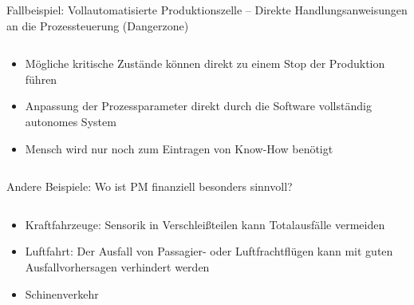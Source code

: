 \documentclass[aspectratio=1610, xcolor=dvipsnames, 9pt]{beamer}
\begin{document}
          \begin{frame}{Fallbeispiel: Vollautomatisierte Produktionszelle -- Direkte Handlungsanweisungen an die Prozessteuerung (Dangerzone)}
            \begin{columns}
              \begin{column}{0.6\textwidth}
                \begin{itemize}
                  \item Mögliche kritische Zustände können direkt zu einem Stop der Produktion führen \newline
                  \item Anpassung der Prozessparameter direkt durch die Software \rightarrow vollständig autonomes System \newline 
                  \item Mensch wird nur noch zum Eintragen von Know-How benötigt \newline
                \end{itemize}
              \end{column}
            \end{columns}
          \end{frame}

          
          \begin{frame}{Andere Beispiele: Wo ist PM finanziell besonders sinnvoll?}
            \begin{columns}
              \begin{column}{1\textwidth}
                \begin{itemize}
                  \item Kraftfahrzeuge: Sensorik in Verschleißteilen kann Totalausfälle vermeiden \newline
                  \item Luftfahrt: Der Ausfall von Passagier- oder Luftfrachtflügen kann mit guten Ausfallvorhersagen verhindert werden   \newline 
                  \item Schinenverkehr \newline
                \end{itemize}
              \end{column}
            \end{columns}
          \end{frame}
\end{document}
